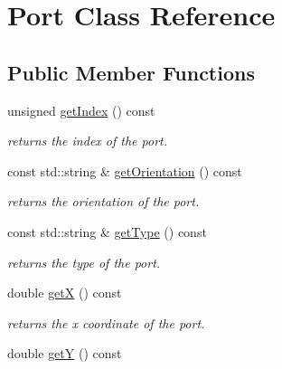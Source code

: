 \hypertarget{class_open_chams_1_1_port}{\section{Port Class Reference}
\label{class_open_chams_1_1_port}
}
\subsection*{Public Member Functions}
\begin{DoxyCompactItemize}
\item 
\hypertarget{class_open_chams_1_1_port_affe6668af1b3e04a80ff75e55f8024ef}{unsigned \hyperlink{class_open_chams_1_1_port_affe6668af1b3e04a80ff75e55f8024ef}{get\-Index} () const }\label{class_open_chams_1_1_port_affe6668af1b3e04a80ff75e55f8024ef}

\begin{DoxyCompactList}\small\item\em returns the index of the port. \end{DoxyCompactList}\item 
\hypertarget{class_open_chams_1_1_port_acbe891eaa3be07cacb7385362ab98ecc}{const std\-::string \& \hyperlink{class_open_chams_1_1_port_acbe891eaa3be07cacb7385362ab98ecc}{get\-Orientation} () const }\label{class_open_chams_1_1_port_acbe891eaa3be07cacb7385362ab98ecc}

\begin{DoxyCompactList}\small\item\em returns the orientation of the port. \end{DoxyCompactList}\item 
\hypertarget{class_open_chams_1_1_port_a03950ba8678003d3a246bbd1d03cfbfb}{const std\-::string \& \hyperlink{class_open_chams_1_1_port_a03950ba8678003d3a246bbd1d03cfbfb}{get\-Type} () const }\label{class_open_chams_1_1_port_a03950ba8678003d3a246bbd1d03cfbfb}

\begin{DoxyCompactList}\small\item\em returns the type of the port. \end{DoxyCompactList}\item 
\hypertarget{class_open_chams_1_1_port_af71e522ec6aa935c2618819b54f20e02}{double \hyperlink{class_open_chams_1_1_port_af71e522ec6aa935c2618819b54f20e02}{get\-X} () const }\label{class_open_chams_1_1_port_af71e522ec6aa935c2618819b54f20e02}

\begin{DoxyCompactList}\small\item\em returns the x coordinate of the port. \end{DoxyCompactList}\item 
\hypertarget{class_open_chams_1_1_port_acd84440598b1da2a23c326ce371db4e4}{double \hyperlink{class_open_chams_1_1_port_acd84440598b1da2a23c326ce371db4e4}{get\-Y} () const }\label{class_open_chams_1_1_port_acd84440598b1da2a23c326ce371db4e4}


\end{DoxyCompactItemize}
